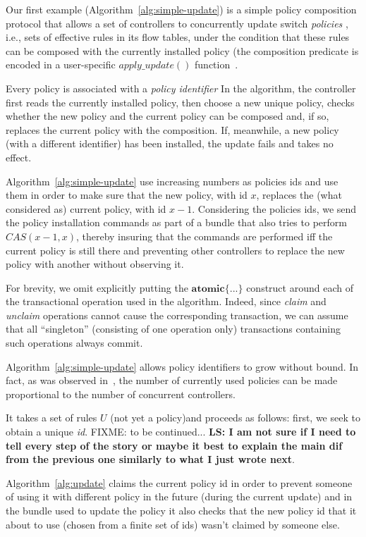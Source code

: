\documentclass[conference]{sigcomm-alternate}
\begin{document}
Our first example (Algorithm~\ref{alg:simple-update}) is a simple policy composition protocol that
allows a set of  controllers to concurrently update switch  \emph{policies} , i.e., sets of
effective rules in its flow tables, under the
condition that these rules can be composed with the currently installed
policy (the composition predicate is encoded in a user-specific
$\textit{apply\_update}()$ function~\cite{cpc}.  

Every policy is associated with a \emph{policy identifier} 
In the algorithm, the controller first reads the currently installed
policy, then choose a new unique policy, checks whether the new
policy and the current policy can be composed and, if so, replaces the
current policy with the composition. If, meanwhile, a new
policy (with a different identifier) has been installed, the update
fails and takes no effect. 

Algorithm~\ref{alg:simple-update} use increasing numbers as policies
ids and use them in order to make sure that the new policy, with id
$x$, replaces the (what considered as) current policy, with id
$x-1$. Considering the policies ids, we send the policy installation
commands as part of a bundle that also tries to perform
$CAS(x-1,x)$, thereby insuring that the commands are
performed iff the current policy is still there and preventing other
controllers to replace the new policy with another without observing it.

For brevity, we omit explicitly putting the $\textbf{atomic}\{...\}$ construct
around each of the transactional operation used in the algorithm.   
Indeed, since \textit{claim} and \textit{unclaim} operations cannot
cause the corresponding transaction, we can assume that all
``singleton'' (consisting of one operation only)  transactions
containing such operations always commit.    

Algorithm~\ref{alg:simple-update} allows policy identifiers to grow
without bound. In fact, as was observed in~\cite{cpc}, the number of currently
used policies can be made proportional to the number of concurrent
controllers.
 
 
 It takes a set of rules $U$ (not yet a policy)and proceeds as follows: first, we seek to
 obtain a unique \emph{id}. FIXME: to be continued...
 \textbf{LS: I am not sure if I need to tell every step of the story or maybe it best to explain the main dif from the previous one similarly to what I just wrote next}.
 
Algorithm~\ref{alg:update} claims the current policy id in order to prevent someone of using it with different policy in the future (during the current update) and in the bundle used to update the policy it also checks that the new policy id that it about to use (chosen from a finite set of ids) wasn't claimed by someone else. 
\end{document}
